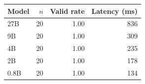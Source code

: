 \begin{tabular}{@{}lrrr@{}}
\toprule
Model & $n$ & Valid rate & Latency (ms) \\
\midrule
27B & 20 & 1.00 & 836 \\ %
9B & 20 & 1.00 & 309 \\ %
4B & 20 & 1.00 & 235 \\ %
2B & 20 & 1.00 & 178 \\ %
0.8B & 20 & 1.00 & 134 \\ %
\bottomrule
\end{tabular}
